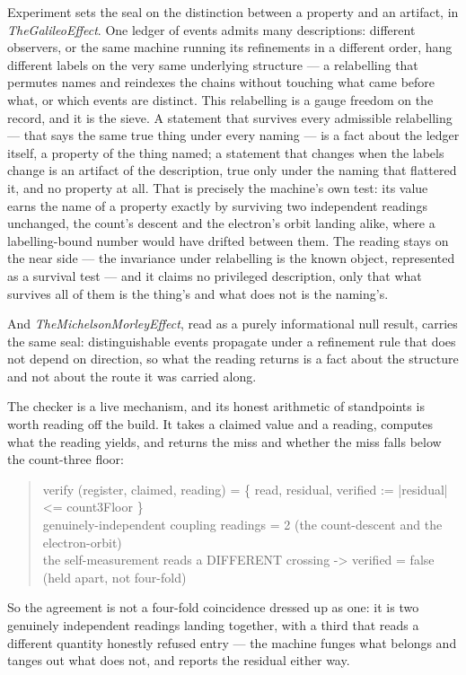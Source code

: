 Experiment sets the seal on the distinction between a property and an artifact, in \emph{TheGalileoEffect}.
One ledger of events admits many descriptions: different observers, or the same machine running its refinements in a
different order, hang different labels on the very same underlying structure --- a relabelling that permutes names and
reindexes the chains without touching what came before what, or which events are distinct.
This relabelling is a gauge freedom on the record, and it is the sieve.
A statement that survives every admissible relabelling --- that says the same true thing under every naming --- is a fact
about the ledger itself, a property of the thing named; a statement that changes when the labels change is an artifact of
the description, true only under the naming that flattered it, and no property at all.
That is precisely the machine's own test: its value earns the name of a property exactly by surviving two independent
readings unchanged, the count's descent and the electron's orbit landing alike, where a labelling-bound number would have
drifted between them.
The reading stays on the near side --- the invariance under relabelling is the known object, represented as a survival
test --- and it claims no privileged description, only that what survives all of them is the thing's and what does not is
the naming's.

And \emph{TheMichelsonMorleyEffect}, read as a purely informational null result, carries the same seal: distinguishable
events propagate under a refinement rule that does not depend on direction, so what the reading returns is a fact about
the structure and not about the route it was carried along.

The checker is a live mechanism, and its honest arithmetic of standpoints is worth reading off the build.
It takes a claimed value and a reading, computes what the reading yields, and returns the miss and whether the miss falls
below the count-three floor:
\begin{quote}\ttfamily
verify (register, claimed, reading) = \{ read, residual, verified := |residual| <= count3Floor \}\\
genuinely-independent coupling readings = 2   (the count-descent and the electron-orbit)\\
the self-measurement reads a DIFFERENT crossing -> verified = false  (held apart, not four-fold)
\end{quote}
So the agreement is not a four-fold coincidence dressed up as one: it is two genuinely independent readings landing
together, with a third that reads a different quantity honestly refused entry --- the machine funges what belongs and
tanges out what does not, and reports the residual either way.

